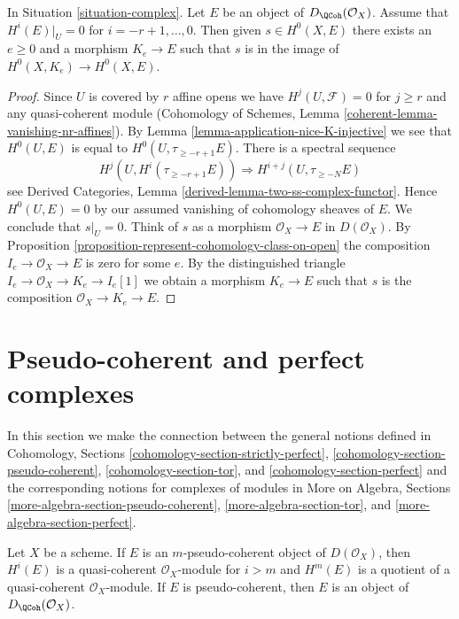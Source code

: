 \begin{lemma}
\label{lemma-represent-cohomology-class-on-closed}
In Situation \ref{situation-complex}. Let $E$ be an object of
$D_\QCoh(\mathcal{O}_X)$.
Assume that $H^i(E)|_U = 0$ for $i = - r + 1, \ldots, 0$.
Then given $s \in H^0(X, E)$ there exists an $e \geq 0$ and
a morphism $K_e \to E$ such that $s$ is in the image of
$H^0(X, K_e) \to H^0(X, E)$.
\end{lemma}

\begin{proof}
Since $U$ is covered by $r$ affine opens we have $H^j(U, \mathcal{F}) = 0$
for $j \geq r$ and any quasi-coherent module
(Cohomology of Schemes, Lemma \ref{coherent-lemma-vanishing-nr-affines}).
By Lemma \ref{lemma-application-nice-K-injective} we see that $H^0(U, E)$
is equal to $H^0(U, \tau_{\geq -r + 1}E)$. There is
a spectral sequence
$$
H^j(U, H^i(\tau_{\geq -r + 1}E)) \Rightarrow H^{i + j}(U, \tau_{\geq -N}E)
$$
see Derived Categories, Lemma \ref{derived-lemma-two-ss-complex-functor}.
Hence $H^0(U, E) = 0$ by our assumed vanishing of cohomology sheaves of $E$.
We conclude that $s|_U = 0$.
Think of $s$ as a morphism $\mathcal{O}_X \to E$ in $D(\mathcal{O}_X)$.
By Proposition \ref{proposition-represent-cohomology-class-on-open}
the composition $I_e \to \mathcal{O}_X \to E$ is zero for some $e$.
By the distinguished triangle $I_e \to \mathcal{O}_X \to K_e \to I_e[1]$
we obtain a morphism $K_e \to E$ such that $s$ is the composition
$\mathcal{O}_X \to K_e \to E$.
\end{proof}


\section{Pseudo-coherent and perfect complexes}
\label{section-spell-out}

\noindent
In this section we make the connection between the general
notions defined in
Cohomology, Sections \ref{cohomology-section-strictly-perfect},
\ref{cohomology-section-pseudo-coherent},
\ref{cohomology-section-tor}, and
\ref{cohomology-section-perfect}
and the corresponding notions for complexes of modules in
More on Algebra, Sections
\ref{more-algebra-section-pseudo-coherent},
\ref{more-algebra-section-tor}, and
\ref{more-algebra-section-perfect}.

\begin{lemma}
\label{lemma-pseudo-coherent}
Let $X$ be a scheme. If $E$ is an $m$-pseudo-coherent
object of $D(\mathcal{O}_X)$, then $H^i(E)$ is a quasi-coherent
$\mathcal{O}_X$-module for $i > m$ and $H^m(E)$ is a quotient
of a quasi-coherent $\mathcal{O}_X$-module.
If $E$ is pseudo-coherent, then $E$ is an object of
$D_\QCoh(\mathcal{O}_X)$.
\end{lemma}

